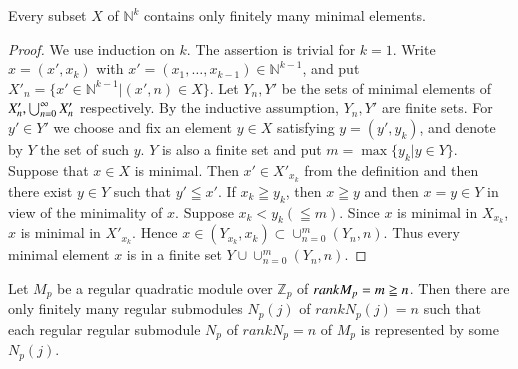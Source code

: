 \setcounter{lemma}{36}
\begin{lemma}\label{c2:lem-2.37}
Every subset $X$ of $\mathbb{N}^k$ contains only finitely many minimal
elements.
\end{lemma}

\begin{proof}
We use induction on $k$. The assertion is trivial for $k=1$. Write
$x=(x',x_k)$ with $x'=(x_1, \ldots ,
x_{k-1})\in \mathbb{N}^{k-1}$, and put $X'_n = \{
x' \in \mathbb{N}^{k-1}|(x',n) \in X\}$. Let $Y_n, Y'$
be the sets of minimal elements of $X'_n, \bigcup^{\infty}_{n=0}\break X'_n$
respectively. By the inductive assumption, $Y_n, Y'$ are finite
sets. For $y'\in Y'$ we choose and fix an element
$y\in X$ satisfying $y=(y', y_k)$, and denote by $Y$ the set
of such $y$. $Y$ is also a finite set and put $m=\max\{
y_k|y\in Y\}$. Suppose that $x\in X$ is minimal. Then
$x'\in X'_{x_k}$ from the definition and then there exist
$y \in Y$ such that $y'\leqq x'$. If $x_k \geqq y_k$, then
$x \geqq y$ and then $x=y\in Y$ in view of the minimality of
$x$. Suppose $x_k < y_k (\leqq m)$. Since $x$ is minimal in $X_{x_k}$,
$x$ is minimal in $X'_{x_k}$. Hence $x\in (Y_{x_k},
x_k) \subset \cup^m_{n=0} (Y_n, n)$. Thus every minimal element $x$ is
in a finite set $Y\cup \cup^m_{n=0} (Y_n,n)$. 
\end{proof}

\begin{lemma}\label{c2:lem-2.38}
Let $M_p$ be a regular quadratic module over $\mathbb{Z}_p$ of $rank\break
M_p = m \geqq n$. Then there are only finitely many regular submodules
$N_p(j)$ of $rank N_p(j) =n$ such that each regular regular submodule
$N_p$ of $rank N_p =n$ of $M_p$ is represented by some $N_p(j)$.
\end{lemma}

